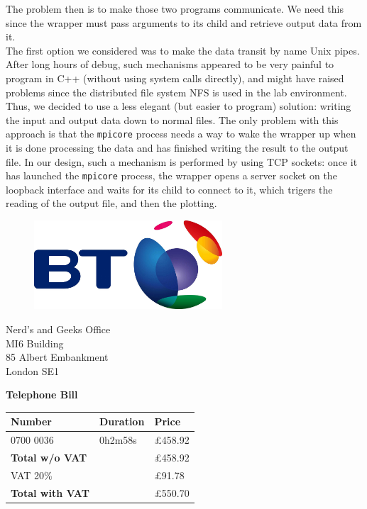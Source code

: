 \documentclass[11pt,a4paper]{article}
\begin{document}
The problem then is to make those two programs communicate. We need this since the wrapper must pass arguments to its child and retrieve output data from it.\\

The first option we considered was to make the data transit by name Unix pipes. After long hours of debug, such mechanisms appeared to be very painful to program in C++ (without using system calls directly), and might have raised problems since the distributed file system NFS is used in the lab environment.\\

Thus, we decided to use a less elegant (but easier to program) solution: writing the input and output data down to normal files. The only problem with this approach is that the \verb_mpicore_ process needs a way to wake the wrapper up when it is done processing the data and has finished writing the result to the output file. In our design, such a mechanism is performed by using TCP sockets: once it has launched the \verb_mpicore_ process, the wrapper opens a server socket on the loopback interface and waits for its child to connect to it, which trigers the reading of the output file, and then the plotting.

\newpage

\begin{figure}[!h]
\includegraphics[width=7cm]{bt.jpg}
\end{figure}

\raggedleft
Nerd's and Geeks Office\\
MI6 Building\\
85 Albert Embankment\\
London SE1\\

\raggedright
\vspace{1cm}
\Huge{\textbf{Telephone Bill}}

\vspace{1cm}

\normalsize

\begin{tabularx}{\textwidth}{X X X}
  Number & Duration & Price \\
  \hline
  0700 0036 & 0h2m58s & \pounds458.92 \\
  \hline
  \textbf{Total w/o VAT} &  & \pounds458.92 \\
  \hline
  VAT 20\% & & \pounds91.78 \\
  \hline
  \textbf{Total with VAT} & & \pounds550.70 \\
\end{tabularx}
\end{document}
